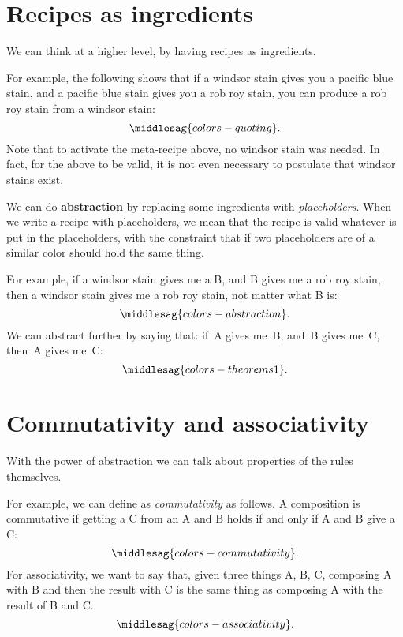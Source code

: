 \section{Recipes as ingredients}


We can think at a higher level, by having recipes as ingredients.

For example, the following shows that if a windsor stain gives you a pacific blue stain, and a pacific blue stain gives you a rob roy stain, you can produce a rob roy stain from a windsor stain:
%
\begin{equation}
    \label{eq:colors-quoting}
    \middlesag{colors-quoting}.
\end{equation}
%
Note that to activate the meta-recipe above, no windsor stain was needed.
In fact, for the above to be valid, it is not even necessary to postulate that windsor stains exist.

We can do \textbf{abstraction} by replacing some ingredients with \emph{placeholders}.
When we write a recipe with placeholders, we mean that the recipe is valid whatever is put in the placeholders, with the constraint that if two placeholders are of a similar color should hold the same thing.

For example, if a windsor stain gives me a B, and B gives me a rob roy stain, then a windsor stain gives me a rob roy stain, not matter what B is:
%
\begin{equation}
    \label{eq:colors-abstraction}
    \middlesag{colors-abstraction}.
\end{equation}
%
We can abstract further by saying that: if~A gives me~B, and~B gives me~C, then~A gives me~C:
%
\begin{equation}
    \label{eq:colors-theorems}
    \middlesag{colors-theorems1}.
\end{equation}

\section{Commutativity and associativity}
With the power of abstraction we can talk about properties of the rules themselves.

For example, we can define as \emph{commutativity} as follows.
A composition is commutative if getting a C from an A and B holds if and only if A and B give a C:
\begin{equation}
    \label{eq:colors-commutativity}
    \middlesag{colors-commutativity}.
\end{equation}
%
For associativity, we want to say that, given three things A, B, C, composing A with B and then the result with C is the same thing as composing A with the result of B and C.
\begin{equation}
    \label{eq:colors-associativity}
    \middlesag{colors-associativity}.
\end{equation}

